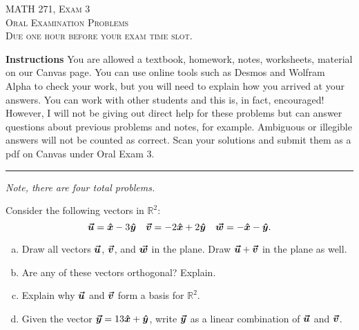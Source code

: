 \documentclass[12pt]{amsbook}
\newcommand{\R}{\mathbb{R}}
\begin{document}

\begin{center}
   \textsc{\large MATH 271, Exam 3}\\
   \textsc{Oral Examination Problems}\\
   \textsc{Due one hour before your exam time slot.}
\end{center}

\vspace{1cm}

\noindent\textbf{Instructions} \; You are allowed a textbook, homework, notes, worksheets, material on our Canvas page.  You can use online tools such as Desmos and Wolfram Alpha to check your work, but you will need to explain how you arrived at your answers.  You can work with other students and this is, in fact, encouraged! However, I will not be giving out direct help for these problems but can answer questions about previous problems and notes, for example. Ambiguous or illegible answers will not be counted as correct. Scan your solutions and submit them as a pdf on Canvas under Oral Exam 3.


\vspace{1cm}


\hrule

\vspace*{1cm}
\noindent\emph{Note, there are four total problems.}

\newpage
\begin{problem}
Consider the following vectors in $\R^2$:
\[
\boldsymbol{\boldsymbol{\vec{u}}} = \boldsymbol{\hat{x}} -3\boldsymbol{\hat{y}} \quad \boldsymbol{\boldsymbol{\vec{v}}} = -2\boldsymbol{\hat{x}} + 2\boldsymbol{\hat{y}} \quad \boldsymbol{\boldsymbol{\vec{w}}} = -\boldsymbol{\hat{x}} -\boldsymbol{\hat{y}}.
\]
\begin{enumerate}[(a)]
    \item Draw all vectors $\boldsymbol{\boldsymbol{\vec{u}}}$, $\boldsymbol{\boldsymbol{\vec{v}}}$, and $\boldsymbol{\boldsymbol{\vec{w}}}$ in the plane. Draw $\boldsymbol{\boldsymbol{\vec{u}}} + \boldsymbol{\boldsymbol{\vec{v}}}$ in the plane as well.
    \item Are any of these vectors orthogonal? Explain.
    \item Explain why $\boldsymbol{\boldsymbol{\vec{u}}}$ and $\boldsymbol{\boldsymbol{\vec{v}}}$ form a basis for $\R^2$.
    \item Given the vector $\boldsymbol{\boldsymbol{\vec{y}}} = 13\boldsymbol{\hat{x}} + \boldsymbol{\hat{y}}$, write $\boldsymbol{\boldsymbol{\vec{y}}}$ as a linear combination of $\boldsymbol{\boldsymbol{\vec{u}}}$ and $\boldsymbol{\boldsymbol{\vec{v}}}$.
\end{enumerate}
\end{problem}
\end{document}
